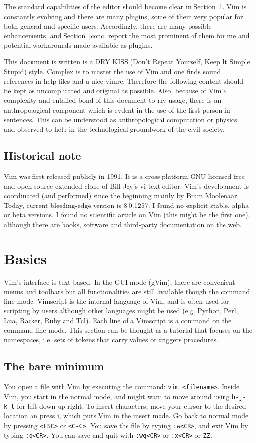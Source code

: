 \documentclass{article}
\newcommand{\tttt}[1] {
	\texttt{#1}}
\begin{document}
The standard capabilities of the editor
should become clear in Section~\ref{basics}.
Vim is constantly evolving and there are many plugins,
some of them very popular for both general and specific
users.
Accordingly, there are many possible enhancements,
and Section~\ref{conc} report the most prominent of them
for me and potential workarounds made available as plugins.

This document is written is a DRY KISS
(Don't Repeat Yourself, Keep It Simple Stupid) style.
Complex is to master the use of Vim
and one finds sound
references in help files and a nice vimrc.
Therefore the following content should be kept
as uncomplicated and original as possible.
Also, because of Vim's complexity and entailed
bond of this document to my usage,
there is an anthropological component
which is evdent in the use of the first person
in sentences.
This can be understood as anthropological computation
or physics~\cite{anPh,anPh2} and observed to help
in the technological groundwork of the civil society.


\subsection{Historical note}
Vim was first released publicly in 1991.
It is a cross-platform GNU licensed free and open source extended clone of Bill Joy's vi text editor.
Vim's development is coordinated (and performed) since the beginning
mainly by Bram Moolenaar.
Today, current bleeding-edge version is 8.0.1257.
I found no explicit stable, alpha or beta versions.
I found no scientific article on Vim 
(this might be the first one), although there are
books, software and third-party documentation on the web.

\section{Basics}\label{basics}
Vim's interface is text-based.
In the GUI mode (gVim),
there are convenient menus and toolbars
but all functionalities are still available though
the command line mode.
Vimscript is the internal language of Vim,
and is often used for scripting by users
although other languages might be used 
(e.g. Python, Perl, Lua, Racker, Ruby and Tcl). 
Each line of a Vimscript is a command on the
command-line mode.
This section can be thought as a tutorial
that focuses on the namespaces, i.e. sets of tokens
that carry values or triggers procedures.

\subsection{The bare minimum}\label{minimum}
You open a file with Vim by executing
the command: \texttt{vim <filename>}.
Inside Vim, you start in the normal
mode, and might want to move around using
\texttt{h-j-k-l} for left-down-up-right.
To insert characters, move your
cursor to the desired location an press i,
which puts Vim in the insert mode.
Go back to normal mode by pressing
\texttt{<ESC>} or \texttt{<C-C>}.
You save the file by typing \texttt{:w<CR>},
and exit Vim by typing \texttt{:q<CR>}.
You can save and quit with \tttt{:wq<CR>}
or \tttt{:x<CR>} or \tttt{ZZ}.
\end{document}
